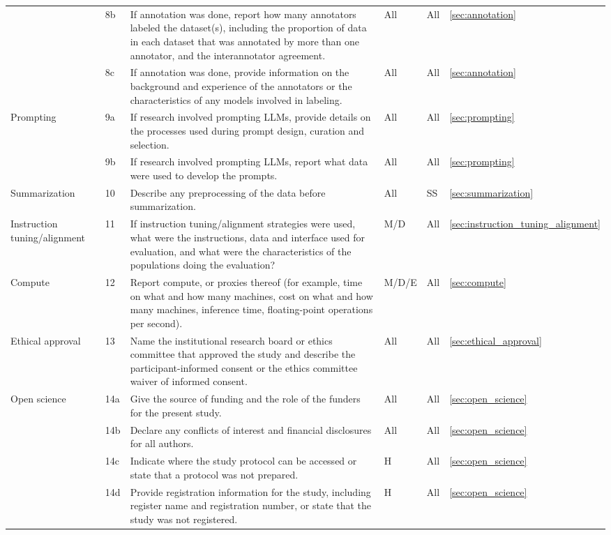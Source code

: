\documentclass{article}
\begin{document}
\begin{longtable}{p{} l p{} l p{} l }
    & 8b & If annotation was done, report how many annotators labeled the dataset(s), including the proportion of data in each dataset that was annotated by more than one annotator, and the interannotator agreement. & All & All & \ref{sec:annotation} \\
    & 8c & If annotation was done, provide information on the background and experience of the annotators or the characteristics of any models involved in labeling. & All & All & \ref{sec:annotation} \\
    \multirow{2}{4em}{Prompting} & 9a & If research involved prompting LLMs, provide details on the processes used during prompt design, curation and selection. & All & All & \ref{sec:prompting} \\
    & 9b & If research involved prompting LLMs, report what data were used to develop the prompts. & All & All & \ref{sec:prompting} \\
    Summarization & 10 & Describe any preprocessing of the data before summarization. & All & SS & \ref{sec:summarization} \\
    Instruction tuning/alignment & 11 & If instruction tuning/alignment strategies were used, what were the instructions, data and interface used for evaluation, and what were the characteristics of the populations doing the evaluation? & M/D & All & \ref{sec:instruction_tuning_alignment} \\
    Compute & 12 & Report compute, or proxies thereof (for example, time on what and how many machines, cost on what and how many machines, inference time, floating-point operations per second). & M/D/E & All & \ref{sec:compute} \\
    Ethical approval & 13 & Name the institutional research board or ethics committee that approved the study and describe the participant-informed consent or the ethics committee waiver of informed consent. & All & All & \ref{sec:ethical_approval} \\
    \multirow{6}{4em}{Open science} & 14a & Give the source of funding and the role of the funders for the present study. & All & All & \ref{sec:open_science} \\
    & 14b & Declare any conflicts of interest and financial disclosures for all authors. & All & All & \ref{sec:open_science}  \\
    & 14c & Indicate where the study protocol can be accessed or state that a protocol was not prepared. & H & All & \ref{sec:open_science}  \\
    & 14d & Provide registration information for the study, including register name and registration number, or state that the study was not registered. & H & All & \ref{sec:open_science}  \\

\end{longtable}
\end{document}
